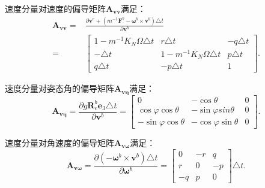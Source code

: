 速度分量对速度的偏导矩阵$\boldsymbol{A}_{\boldsymbol{vv}}$满足：
\begin{equation}
    \begin{aligned}
        \boldsymbol{A}_{\boldsymbol{vv}} =& \frac{\partial \boldsymbol{v}^e + (m^{-1}\boldsymbol{F}^b - \boldsymbol{\omega}^b\times\boldsymbol{v}^b) \triangle t}{\partial \boldsymbol{v}^b} \\
        =& 
        \begin{bmatrix}
            1 - m^{-1} K_N \Omega \triangle t & r \triangle t & -q \triangle t \\
            - \triangle t & 1 - m^{-1} K_N \Omega \triangle t & p \triangle t \\
            q \triangle t & - p \triangle t & 1
        \end{bmatrix}.
    \end{aligned}
\end{equation}

速度分量对姿态角的偏导矩阵$\boldsymbol{A}_{\boldsymbol{v\eta}}$满足：
\begin{equation}
    \boldsymbol{A}_{\boldsymbol{v \eta}} = \frac{\partial g \boldsymbol{R}_e^b \boldsymbol{e}_3 \triangle t}{\partial \boldsymbol{v}^b} =
    \begin{bmatrix}
        0 & -\cos\theta & 0 \\
        \cos\varphi \cos\theta & -\sin\varphi sin\theta & 0 \\
        -\sin\varphi \cos\theta & -\cos\varphi \sin\theta & 0
    \end{bmatrix}.
\end{equation}

速度分量对角速度的偏导矩阵$\boldsymbol{A}_{\boldsymbol{v\omega}}$满足：
\begin{equation}
    \boldsymbol{A}_{\boldsymbol{v \omega}} = \frac{\partial (-\boldsymbol{\omega}^b \times \boldsymbol{v}^b) \triangle t}{\partial \boldsymbol{\omega}^b} =
    \begin{bmatrix}
        0 & -r & q \\
        r & 0 & -p \\
        -q & p & 0
    \end{bmatrix} \triangle t.
\end{equation}

